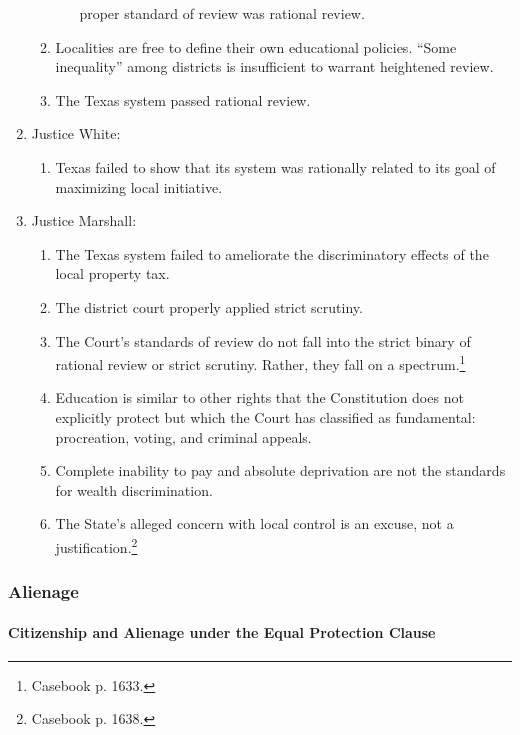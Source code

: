 \begin{enumerate}
\begin{enumerate}
\begin{enumerate}
            proper standard of review was rational review.
        \end{enumerate}
        \item Localities are free to define their own educational policies. 
        ``Some inequality'' among districts is insufficient to warrant 
        heightened review.
        \item The Texas system passed rational review.
    \end{enumerate}
    \item Justice White:
    \begin{enumerate}
        \item Texas failed to show that its system was rationally related to 
        its goal of maximizing local initiative.
    \end{enumerate}
    \item Justice Marshall:
    \begin{enumerate}
        \item The Texas system failed to ameliorate the discriminatory effects 
        of the local property tax.
        \item The district court properly applied strict scrutiny.
        \item The Court's standards of review do not fall into the strict 
        binary of rational review or strict scrutiny. Rather, they fall on a 
        spectrum.\footnote{Casebook p. 1633.}
        \item Education is similar to other rights that the Constitution does 
        not explicitly protect but which the Court has classified as 
        fundamental: procreation, voting, and criminal appeals.
        \item Complete inability to pay and absolute deprivation are not the 
        standards for wealth discrimination.
        \item The State's alleged concern with local control is an excuse, not 
        a justification.\footnote{Casebook p. 1638.}
    \end{enumerate}
\end{enumerate}

\subsubsection{Alienage}

\paragraph{Citizenship and Alienage under the Equal Protection Clause}

